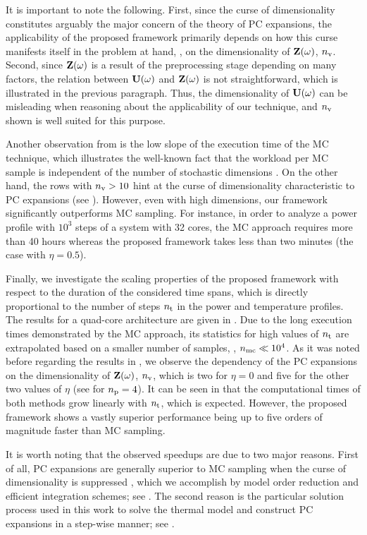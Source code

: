 It is important to note the following.
First, since the curse of dimensionality constitutes arguably the major concern of the theory of PC expansions, the applicability of the proposed framework primarily depends on how this curse manifests itself in the problem at hand, \ie, on the dimensionality of $\mathbf{Z}(\omega)$, ${n_\text{v}}$.
Second, since $\mathbf{Z}(\omega)$ is a result of the preprocessing stage depending on many factors, the relation between $\mathbf{U}(\omega)$ and $\mathbf{Z}(\omega)$ is not straightforward, which is illustrated in the previous paragraph.
Thus, the dimensionality of $\mathbf{U}(\omega)$ can be misleading when reasoning about the applicability of our technique, and ${n_\text{v}}$ shown  is well suited for this purpose.

Another observation from  is the low slope of the execution time of the MC technique, which illustrates the well-known fact that the workload per MC sample is independent of the number of stochastic dimensions \cite{maitre2010}.
On the other hand, the rows with ${n_\text{v}} > 10$ hint at the curse of dimensionality characteristic to PC expansions (see ).
However, even with high dimensions, our framework significantly outperforms MC sampling. For instance, in order to analyze a power profile with $10^3$ steps of a system with 32 cores, the MC approach requires more than 40 hours whereas the proposed framework takes less than two minutes (the case with $\eta = 0.5$).

Finally, we investigate the scaling properties of the proposed framework with respect to the duration of the considered time spans, which is directly proportional to the number of steps ${n_\text{t}}$ in the power and temperature profiles.
The results for a quad-core architecture are given in .
Due to the long execution times demonstrated by the MC approach, its statistics for high values of ${n_\text{t}}$ are extrapolated based on a smaller number of samples, \ie, ${n_\text{mc}} \ll 10^4$.
As it was noted before regarding the results in , we observe the dependency of the PC expansions on the dimensionality of $\mathbf{Z}(\omega)$, ${n_\text{v}}$, which is two for $\eta = 0$ and five for the other two values of $\eta$ (see  for ${n_\text{p}} = 4$).
It can be seen in  that the computational times of both methods grow linearly with ${n_\text{t}}$, which is expected.
However, the proposed framework shows a vastly superior performance being up to five orders of magnitude faster than MC sampling.

It is worth noting that the observed speedups are due to two major reasons.
First of all, PC expansions are generally superior to MC sampling when the curse of dimensionality is suppressed \cite{xiu2010, maitre2010, eldred2008}, which we accomplish by model order reduction and efficient integration schemes; see .
The second reason is the particular solution process used in this work to solve the thermal model and construct PC expansions in a step-wise manner; see .

